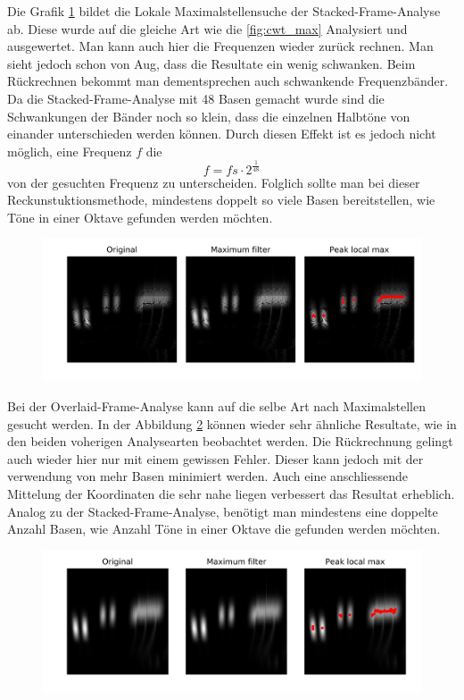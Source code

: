 Die Grafik \ref{fig:stacked_max} bildet die Lokale Maximalstellensuche der Stacked-Frame-Analyse ab. Diese wurde auf die gleiche Art wie die \ref{fig:cwt_max} Analysiert und ausgewertet. Man kann auch hier die Frequenzen wieder zurück rechnen. Man sieht jedoch schon von Aug, dass die Resultate ein wenig schwanken. Beim Rückrechnen bekommt man dementsprechen auch schwankende Frequenzbänder. Da die Stacked-Frame-Analyse mit 48 Basen gemacht wurde sind die Schwankungen der Bänder noch so klein, dass die einzelnen Halbtöne von einander unterschieden werden können. Durch diesen Effekt ist es jedoch nicht möglich, eine Frequenz $f$ die 
\[f= fs\cdot 2^{\frac{1}{48}}\]  
von der gesuchten Frequenz zu unterscheiden. Folglich sollte man bei dieser Reckunstuktionsmethode, mindestens doppelt so viele Basen bereitstellen, wie Töne in einer Oktave gefunden werden möchten. 
\begin{figure}[!ht]
	\centering
	\includegraphics[width=\linewidth]{papers/autotune/sections/frames/images/Stacked/dwtmaxima.jpg}
	\label{fig:stacked_max}
\end{figure}%


Bei der Overlaid-Frame-Analyse kann auf die selbe Art nach Maximalstellen gesucht werden. In der Abbildung \ref{fig:overlaid_max} können wieder sehr ähnliche Resultate, wie in den beiden voherigen Analysearten beobachtet werden. Die Rückrechnung gelingt auch wieder hier nur mit einem gewissen Fehler. Dieser kann jedoch mit der verwendung von mehr Basen minimiert werden.  Auch eine anschliessende Mittelung der Koordinaten die sehr nahe liegen verbessert das Resultat erheblich. Analog zu der Stacked-Frame-Analyse, benötigt man mindestens eine doppelte Anzahl Basen, wie Anzahl Töne in einer Oktave die gefunden werden möchten.
\begin{figure}[!ht]
	\centering
	\includegraphics[width=\linewidth]{papers/autotune/sections/frames/images/Overlaid/dwtmaxima.jpg}
	\label{fig:overlaid_max}
\end{figure}%

